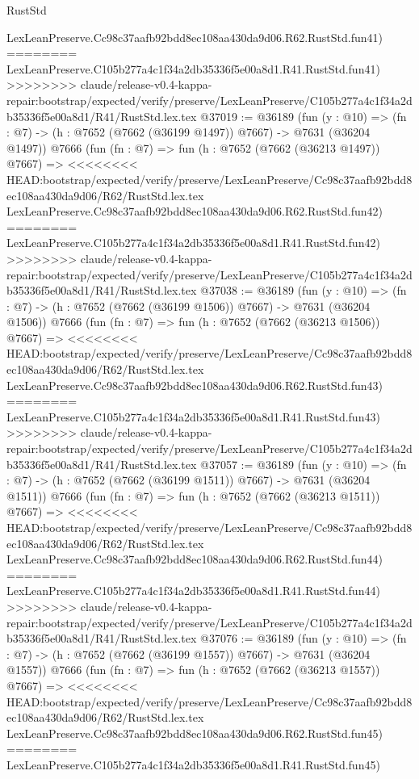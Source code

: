 \begin{lexlean}{RustStd}
\begin{coremodule}
{\begin{coremodule}
{{{{{{{{{{{{{{{{{{{{{{{{{{{{{{{{{{{{{{{{{{{{{{{{{{{{{    LexLeanPreserve.Cc98c37aafb92bdd8ec108aa430da9d06.R62.RustStd.fun41)
========
    LexLeanPreserve.C105b277a4c1f34a2db35336f5e00a8d1.R41.RustStd.fun41)
>>>>>>>> claude/release-v0.4-kappa-repair:bootstrap/expected/verify/preserve/LexLeanPreserve/C105b277a4c1f34a2db35336f5e00a8d1/R41/RustStd.lex.tex
@37019 := @36189
    (fun (y : @10) => (fn : @7) -> (h : @7652 (@7662 (@36199 @1497)) @7667) -> @7631 (@36204 @1497))
    @7666
    (fun (fn : @7) =>
    fun (h : @7652 (@7662 (@36213 @1497)) @7667) =>
<<<<<<<< HEAD:bootstrap/expected/verify/preserve/LexLeanPreserve/Cc98c37aafb92bdd8ec108aa430da9d06/R62/RustStd.lex.tex
    LexLeanPreserve.Cc98c37aafb92bdd8ec108aa430da9d06.R62.RustStd.fun42)
========
    LexLeanPreserve.C105b277a4c1f34a2db35336f5e00a8d1.R41.RustStd.fun42)
>>>>>>>> claude/release-v0.4-kappa-repair:bootstrap/expected/verify/preserve/LexLeanPreserve/C105b277a4c1f34a2db35336f5e00a8d1/R41/RustStd.lex.tex
@37038 := @36189
    (fun (y : @10) => (fn : @7) -> (h : @7652 (@7662 (@36199 @1506)) @7667) -> @7631 (@36204 @1506))
    @7666
    (fun (fn : @7) =>
    fun (h : @7652 (@7662 (@36213 @1506)) @7667) =>
<<<<<<<< HEAD:bootstrap/expected/verify/preserve/LexLeanPreserve/Cc98c37aafb92bdd8ec108aa430da9d06/R62/RustStd.lex.tex
    LexLeanPreserve.Cc98c37aafb92bdd8ec108aa430da9d06.R62.RustStd.fun43)
========
    LexLeanPreserve.C105b277a4c1f34a2db35336f5e00a8d1.R41.RustStd.fun43)
>>>>>>>> claude/release-v0.4-kappa-repair:bootstrap/expected/verify/preserve/LexLeanPreserve/C105b277a4c1f34a2db35336f5e00a8d1/R41/RustStd.lex.tex
@37057 := @36189
    (fun (y : @10) => (fn : @7) -> (h : @7652 (@7662 (@36199 @1511)) @7667) -> @7631 (@36204 @1511))
    @7666
    (fun (fn : @7) =>
    fun (h : @7652 (@7662 (@36213 @1511)) @7667) =>
<<<<<<<< HEAD:bootstrap/expected/verify/preserve/LexLeanPreserve/Cc98c37aafb92bdd8ec108aa430da9d06/R62/RustStd.lex.tex
    LexLeanPreserve.Cc98c37aafb92bdd8ec108aa430da9d06.R62.RustStd.fun44)
========
    LexLeanPreserve.C105b277a4c1f34a2db35336f5e00a8d1.R41.RustStd.fun44)
>>>>>>>> claude/release-v0.4-kappa-repair:bootstrap/expected/verify/preserve/LexLeanPreserve/C105b277a4c1f34a2db35336f5e00a8d1/R41/RustStd.lex.tex
@37076 := @36189
    (fun (y : @10) => (fn : @7) -> (h : @7652 (@7662 (@36199 @1557)) @7667) -> @7631 (@36204 @1557))
    @7666
    (fun (fn : @7) =>
    fun (h : @7652 (@7662 (@36213 @1557)) @7667) =>
<<<<<<<< HEAD:bootstrap/expected/verify/preserve/LexLeanPreserve/Cc98c37aafb92bdd8ec108aa430da9d06/R62/RustStd.lex.tex
    LexLeanPreserve.Cc98c37aafb92bdd8ec108aa430da9d06.R62.RustStd.fun45)
========
    LexLeanPreserve.C105b277a4c1f34a2db35336f5e00a8d1.R41.RustStd.fun45)
}}}}}}}}}}}}}}}}}}}}}}}}}}}}}}}}}}}}}}}}}}}}}}}}}}}}}
\end{coremodule}}
\end{coremodule}
\end{lexlean}

